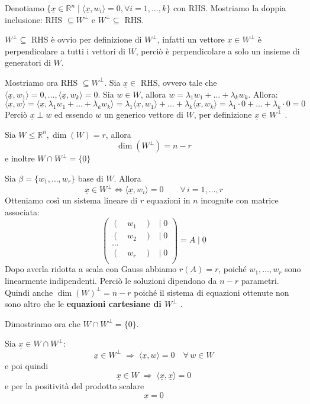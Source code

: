 \documentclass[
  a4paper,
]{article}
\begin{document}
\begin{proofbox}
Denotiamo
\(\{ \underline{x} \in \mathbb{R}^n \mid \langle \underline{x}, w_i \rangle = 0, \forall i = 1,\dots,k\}\)
con RHS. Mostriamo la doppia inclusione: RHS \(\subseteq W^{\perp}\) e
\(W^{\perp} \subseteq\) RHS.

\(W^{\perp} \subseteq\) RHS è ovvio per definizione di \(W^{\perp}\),
infatti un vettore \(\underline{x} \in W^{\perp}\) è perpendicolare a
tutti i vettori di \(W\), perciò è perpendicolare a solo un insieme di
generatori di \(W\).

Mostriamo ora RHS \(\subseteq W^{\perp}\). Sia \(\underline{x} \in\)
RHS, ovvero tale che
\(\langle \underline{x}, w_1 \rangle = 0, \dots, \langle \underline{x}, w_k \rangle = 0\).
Sia \(w \in W\), allora \(w = \lambda_1 w_1 + \dots + \lambda_k w_k\).
Allora: \[
\langle \underline{x}, w \rangle = \langle\underline{x}, \lambda_1 w_1 + \dots + \lambda_k w_k \rangle = \lambda_1 \langle \underline{x}, w_1 \rangle + \dots +\lambda_k \langle \underline{x}, w_k \rangle = \lambda_1 \cdot 0 + \dots + \lambda_k \cdot 0 = 0
\] Perciò \(\underline x \perp w\) ed essendo \(w\) un generico vettore
di \(W\), per definizione \(\underline{x} \in W^{\perp}\) .
\end{proofbox}

\begin{propositionbox}
Sia \(W \le \mathbb{R}^n, \dim(W) = r\), allora \[
\dim(W^{\perp}) = n-r
\] e inoltre \(W \cap W^{\perp} = \{\underline{0}\}\)
\end{propositionbox}

\begin{proofbox}
Sia \(\beta = \{w_1, \dots, w_r\}\) base di \(W\). Allora \[
\underline{x} \in W^{\perp} \iff \langle \underline{x}, w_i \rangle = 0 \qquad\forall\, i = 1, \dots, r
\] Otteniamo così un sistema lineare di \(r\) equazioni in \(n\)
incognite con matrice associata: \[
\begin{pmatrix}  
(\quad w_1\quad ) &|\; 0 \\  
(\quad w_2\quad ) & |\;0 \\
\dots \\
(\quad w_r\quad ) &|\;0 \\
\end{pmatrix}  
= A \mid \underline{0}
\] Dopo averla ridotta a scala con Gauss abbiamo \(r(A) = r\), poiché
\(w_1, \dots, w_r\) sono linearmente indipendenti. Perciò le soluzioni
dipendono da \(n-r\) parametri. Quindi anche \(\dim(W)^{\perp} = n-r\)
poiché il sistema di equazioni ottenute non sono altro che le
\textbf{equazioni cartesiane di \(W^{\perp}\)} .

\bigskip

Dimostriamo ora che \(W \cap W^{\perp} = \{\underline{0}\}\).

Sia \(\underline{x} \in W \cap W^{\perp}\): \[
\underline{x} \in W^{\perp} \;\Longrightarrow\; \langle \underline{x}, w \rangle = 0 \quad\forall\, w \in W
\] e poi quindi \[
\underline{x} \in W \;\Longrightarrow\; \langle \underline{x}, \underline{x} \rangle = 0 
\] e per la positività del prodotto scalare \[
\underline{x} = \underline{0}
\]
\end{proofbox}
\end{document}
